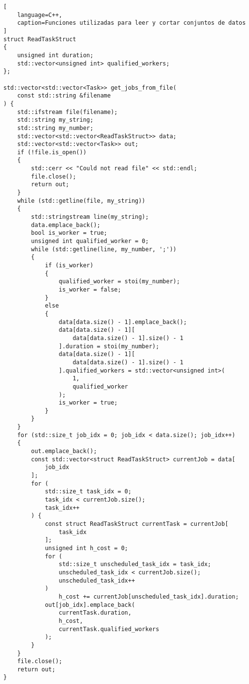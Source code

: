 \begin{lstlisting}[
    language=C++,
    caption=Funciones utilizadas para leer y cortar conjuntos de datos
]
struct ReadTaskStruct
{
    unsigned int duration;
    std::vector<unsigned int> qualified_workers;
};

std::vector<std::vector<Task>> get_jobs_from_file(
    const std::string &filename
) {
    std::ifstream file(filename);
    std::string my_string;
    std::string my_number;
    std::vector<std::vector<ReadTaskStruct>> data;
    std::vector<std::vector<Task>> out;
    if (!file.is_open())
    {
        std::cerr << "Could not read file" << std::endl;
        file.close();
        return out;
    }
    while (std::getline(file, my_string))
    {
        std::stringstream line(my_string);
        data.emplace_back();
        bool is_worker = true;
        unsigned int qualified_worker = 0;
        while (std::getline(line, my_number, ';'))
        {
            if (is_worker)
            {
                qualified_worker = stoi(my_number);
                is_worker = false;
            }
            else
            {
                data[data.size() - 1].emplace_back();
                data[data.size() - 1][
                    data[data.size() - 1].size() - 1
                ].duration = stoi(my_number);
                data[data.size() - 1][
                    data[data.size() - 1].size() - 1
                ].qualified_workers = std::vector<unsigned int>(
                    1,
                    qualified_worker
                );
                is_worker = true;
            }
        }
    }
    for (std::size_t job_idx = 0; job_idx < data.size(); job_idx++)
    {
        out.emplace_back();
        const std::vector<struct ReadTaskStruct> currentJob = data[
            job_idx
        ];
        for (
            std::size_t task_idx = 0;
            task_idx < currentJob.size();
            task_idx++
        ) {
            const struct ReadTaskStruct currentTask = currentJob[
                task_idx
            ];
            unsigned int h_cost = 0;
            for (
                std::size_t unscheduled_task_idx = task_idx;
                unscheduled_task_idx < currentJob.size();
                unscheduled_task_idx++
            )
                h_cost += currentJob[unscheduled_task_idx].duration;
            out[job_idx].emplace_back(
                currentTask.duration,
                h_cost,
                currentTask.qualified_workers
            );
        }
    }
    file.close();
    return out;
}


\end{lstlisting}
